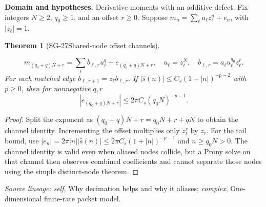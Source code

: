 \documentclass[11pt]{article}
\newtheorem{theorem}{Theorem}[section]
\theoremstyle{definition}\newtheorem{definition}[theorem]{Definition}
\theoremstyle{remark}\newtheorem{remark}[theorem]{Remark}
\begin{document}
\par{\small\textbf{Domain and hypotheses.} Derivative moments with an additive defect. Fix integers $N\ge2$, $q_0\ge1$, and an offset $r\ge0$. Suppose $m_n=\sum_\ell a_\ell z_\ell^n+e_n$, with $|z_\ell|=1$.}\par
\begin{theorem}[SG-27\quad Shared-node offset channels]\label{SG-27}

\[
 m_{(q_0+q)N+r}=\sum_\ell b_{\ell,r}u_\ell^q+e_{(q_0+q)N+r},
 \quad u_\ell=z_\ell^N,\quad b_{\ell,r}=a_\ell u_\ell^{q_0}z_\ell^r.
\]
For each matched edge $b_{\ell,r+1}=z_\ell b_{\ell,r}$.
If $|\widehat s(n)|\le C_s(1+|n|)^{-p-2}$ with $p\ge0$, then for
nonnegative $q,r$
\[
 |e_{(q_0+q)N+r}|\le2\pi C_s(q_0N)^{-p-1}.
\]

\end{theorem}
\begin{proof}

Split the exponent as $(q_0+q)N+r=q_0N+r+qN$ to obtain the channel
identity. Incrementing the offset multiplies only $z_\ell^r$ by $z_\ell$.
For the tail bound, use
$|e_n|=2\pi|n||\widehat s(n)|\le2\pi C_s(1+|n|)^{-p-1}$ and
$n\ge q_0N>0$. The channel identity is valid even when aliased nodes collide,
but a Prony solve on that channel then observes combined coefficients and
cannot separate those nodes using the simple distinct-node theorem.

\end{proof}

\par{\small\color{Teal}\textit{Source lineage:} \textit{self}, Why decimation helps and why it aliases; \textit{complex}, One-dimensional finite-rate packet model.}\par
\end{document}
